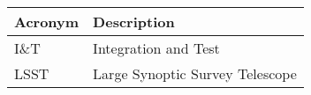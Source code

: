 \addtocounter{table}{-1}
\begin{longtable}{p{}p{}}\hline
\textbf{Acronym} & \textbf{Description}  \\\hline

I\&T & Integration and Test \\\hline
LSST & Large Synoptic Survey Telescope \\\hline
\end{longtable}
